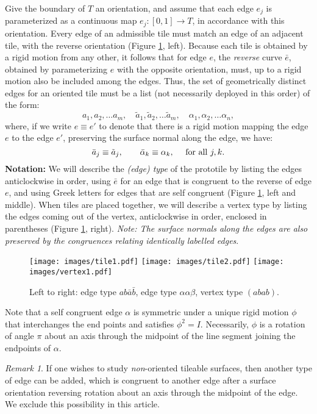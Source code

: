 \documentclass[11pt]{amsart}
\theoremstyle{remark}
\newtheorem{remark}[theorem]{Remark}
\begin{document}
Give the boundary of $T$ an orientation, and assume that each edge $e_j$ is parameterized 
as a continuous map $e_j: [0,1] \to T$,  in accordance with this orientation.   Every edge of 
an admissible tile must match an edge of an adjacent tile, with the reverse orientation (Figure \ref{config1}, left).
Because each tile is obtained by a rigid motion from any other,
it follows that for edge $e$, the \emph{reverse} curve $\bar e$, obtained by parameterizing $e$ 
with the opposite orientation, must, up to a rigid motion also be included among the edges. Thus,  the set of geometrically distinct edges for an oriented tile must be a list (not necessarily deployed in this order) of the form:
\[
a_1, a_2, \dots a_m,  \quad \tilde a_1, \tilde a_2, \dots \tilde a_m,   \quad \alpha_1, \alpha_2, \dots \alpha_n,
\]
where, if we write $e \equiv e'$ to denote that there is a rigid motion mapping the edge $e$ to the 
 edge $e'$, preserving the surface normal along the edge, we have:
\[
\bar a_j \equiv \tilde a_j, \quad \quad \bar \alpha_k \equiv \alpha_k, \quad \hbox{ for all } j, k.
\]
\textbf{Notation:} We will describe the \emph{(edge) type} of the prototile by listing the edges anticlockwise
in order, using $\bar e$ for an edge that is congruent to the reverse of edge $e$, and using Greek letters for edges that 
are self congruent (Figure \ref{config1}, left and middle).   When tiles are placed together, we will describe a vertex 
type by listing the edges coming out of the vertex, anticlockwise in order, enclosed in parentheses (Figure \ref{config1}, right).
\emph{Note: The surface normals along the edges are also preserved by the congruences relating identically  labelled edges}. 

\begin{figure}[h!tbp]
	\begin{center}
	\texttt{[image: images/tile1.pdf]}    \quad   \quad  
	\texttt{[image: images/tile2.pdf]}    \quad  \quad  
		\texttt{[image: images/vertex1.pdf]} 
		\end{center}
	\caption{Left to right: edge type $ab\bar a\bar b$, edge type $\alpha \alpha \beta$, vertex type $(abab)$.}
	\label{config1}
\end{figure}


Note that a self congruent edge $\alpha$ is symmetric under a unique rigid motion
$\phi$ that interchanges the end points and satisfies $\phi^2=I$.  Necessarily, $\phi$ is a 
rotation of angle $\pi$ about an axis through the midpoint of the line segment joining the endpoints  of $\alpha$.
\begin{remark}
If one wishes to study \emph{non}-oriented tileable surfaces, then another type of edge can be added, which is congruent to another edge after a surface orientation reversing rotation about an axis through the midpoint of the edge.  We exclude this possibility in this article.
\end{remark}
\end{document}

